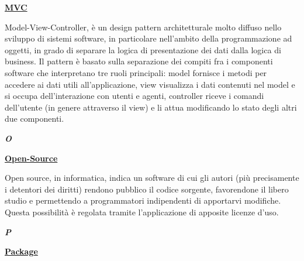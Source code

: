 \bigskip
\begin{addmargin}[0em]{0em}	
	\textbf{\underline{MVC}} 
\end{addmargin}

\medskip
\begin{addmargin}[5em]{1em}	
Model-View-Controller, è un design pattern architetturale molto diffuso nello sviluppo di sistemi software, in particolare nell'ambito della programmazione ad oggetti, in grado di separare la logica di presentazione dei dati dalla logica di business. Il pattern è basato sulla separazione dei compiti fra i componenti software che interpretano tre ruoli principali: model fornisce i metodi per accedere ai dati utili all'applicazione, view visualizza i dati contenuti nel model e si occupa dell'interazione con utenti e agenti, controller riceve i comandi dell'utente (in genere attraverso il view) e li attua modificando lo stato degli altri due componenti.
\end{addmargin}	
	
\newpage

\cleardoublepage
{}
{}
\noindent\hrulefill\hspace{4mm}\textbf{\textsl{\Huge{O}}}\hspace{4mm}\hrulefill

\vspace*{2\bigskipamount}

\begin{addmargin}[0em]{0em}	
	\textbf{\underline{Open-Source}} 
\end{addmargin}
	
\medskip
\begin{addmargin}[5em]{1em}	
Open source, in informatica, indica un software di cui gli autori (più precisamente i detentori dei diritti) rendono pubblico il codice sorgente, favorendone il libero studio e permettendo a programmatori indipendenti di apportarvi modifiche. Questa possibilità è regolata tramite l'applicazione di apposite licenze d'uso.	
\end{addmargin}	
	
\newpage

\cleardoublepage
{}
{}
\noindent\hrulefill\hspace{4mm}\textbf{\textsl{\Huge{P}}}\hspace{4mm}\hrulefill

\vspace*{2\bigskipamount}

\begin{addmargin}[0em]{0em}	
	\textbf{\underline{Package}} 
\end{addmargin}

